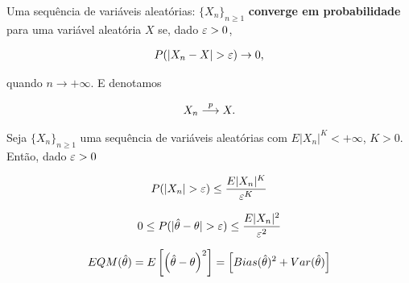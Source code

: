 \documentclass[11pt,oneside,a4paper]{article}
\numberwithin{equation}{section}
\begin{document}
\begin{def1}
Uma sequência de variáveis aleatórias:
$\{ X_{n} \}_{n \geq 1}$ 
\textbf{converge em probabilidade} para uma variável aleatória $X$ se, dado $\varepsilon > 0$, 

\vspace{-1 em}
\begin{align*}
	P(| X_{n} - X | > \varepsilon ) \to 0,
\end{align*}

\noindent
quando $n \to + \infty$.
E denotamos

\vspace{-1 em}
\begin{align*}
	X_{n}  \overset{p}{\longrightarrow}  X.
\end{align*}
\end{def1}

\begin{def1}
Seja
$\{ X_{n} \}_{n \geq 1}$ 
uma sequência de variáveis aleatórias com
$E|X_{n}|^{K} < +\infty$, $K>0$. 
Então, dado $\varepsilon >0$

\vspace{-1 em}
\begin{align*}
	P(| X_{n} | > \varepsilon ) \leq \frac{E|X_{n}|^{K}}{\varepsilon^{K}}
\end{align*}
\end{def1}

\begin{def1} %
\begin{align*}
0 \leq P(| \hat{\theta} - \theta | > \varepsilon ) \leq \frac{E|X_{n}|^{2}}{\varepsilon^{2}}
\end{align*}
\end{def1}

\begin{def1}
\begin{align*}
EQM(\hat{\theta}) 
=
E\left[ \left( \hat{\theta} - \theta \right)^2 \right] 
=
\left[ Bias(\hat{\theta})^{2} + Var(\hat{\theta}) \right]
\end{align*}
\end{def1}
\end{document}
